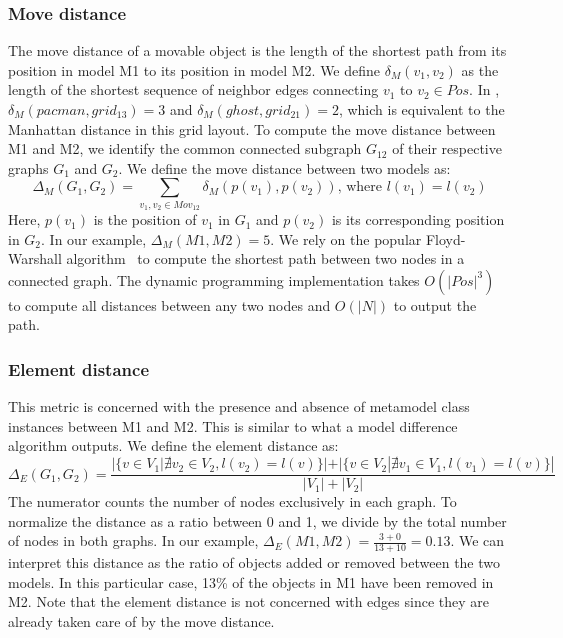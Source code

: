 \subsubsection{Move distance}
The move distance of a movable object is the length of the shortest path from its position in model M1 to its position in model M2.
We define $\delta_M(v_1,v_2)$ as the length of the shortest sequence of neighbor edges connecting $v_1$ to $v_2 \in Pos$.
In , $\delta_M(pacman,grid_{13})=3$ and $\delta_M(ghost,grid_{21})=2$, which is equivalent to the Manhattan distance in this grid layout.
To compute the move distance between M1 and M2, we identify the common connected subgraph $G_{12}$ of their respective graphs $G_1$ and $G_2$.
We define the move distance between two models as:
\[
\Delta_M(G_1,G_2)=\sum_{v_1,v_2 \in Mov_{12}}{\delta_M(p(v_1),p(v_2))} \mbox{, where } l(v_1)=l(v_2)
\]
Here, $p(v_1)$ is the position of $v_1$ in $G_1$ and $p(v_2)$ is its corresponding position in $G_2$.
In our example, $\Delta_M(M1,M2)=5$.
We rely on the popular Floyd-Warshall algorithm~\cite{Floyd1962,Warshall1962} to compute the shortest path between two nodes in a connected graph.
The dynamic programming implementation takes $O(|Pos|^3)$ to compute all distances between any two nodes and $O(|N|)$ to output the path.


\subsubsection{Element distance}
This metric is concerned with the presence and absence of metamodel class instances between M1 and M2.
This is similar to what a model difference algorithm outputs.
We define the element distance as:
\[
\Delta_E(G_1,G_2)=\frac{|\{v \in V_1 | \nexists v_2 \in V_2, l(v_2)=l(v)\}|+|\{v \in V_2 | \nexists v_1 \in V_1, l(v_1)=l(v)\}|}{|V_1|+|V_2|}
\]
The numerator counts the number of nodes exclusively in each graph.
To normalize the distance as a ratio between 0 and 1, we divide by the total number of nodes in both graphs.
In our example, $\Delta_E(M1,M2)=\frac{3+0}{13+10}=0.13$.
We can interpret this distance as the ratio of objects added or removed between the two models.
In this particular case, 13\% of the objects in M1 have been removed in M2.
Note that the element distance is not concerned with edges since they are already taken care of by the move distance.


